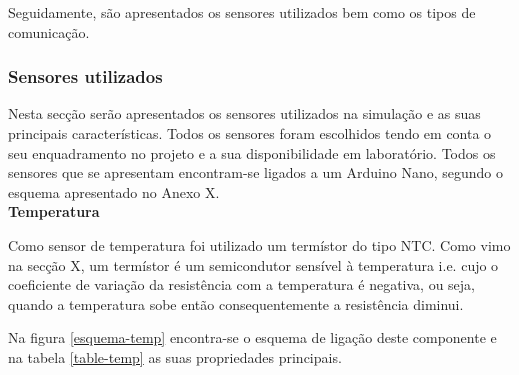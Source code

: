 Seguidamente, são apresentados os sensores utilizados bem como os tipos de comunicação. 
 

\subsubsection{Sensores utilizados}

Nesta secção serão apresentados os sensores utilizados na simulação e as suas principais características. Todos os sensores foram escolhidos tendo em conta o seu enquadramento no projeto e a sua disponibilidade em laboratório. Todos os sensores que se apresentam encontram-se ligados a um Arduino Nano, segundo o esquema apresentado no Anexo X. \\


\textbf{Temperatura}


Como sensor de temperatura foi utilizado um termístor do tipo \ac{NTC}. Como vimo na secção X, um termístor é um semicondutor sensível à temperatura i.e. cujo o coeficiente de variação da resistência com a temperatura é negativa, ou seja, quando a temperatura sobe então consequentemente a resistência diminui. 

Na figura \ref{esquema-temp} encontra-se o esquema de ligação deste componente e na tabela \ref{table-temp} as suas propriedades principais. 


